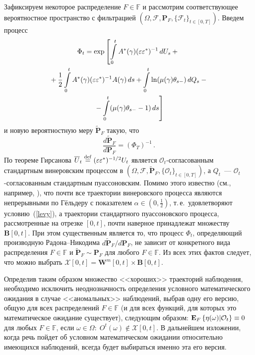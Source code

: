 \begin{multicols}{2}
 Зафиксируем некоторое распределение $F \in \mathbb{F}$ и рассмотрим
 соответствующее вероятностное пространство с фильтрацией
 $(\Omega, \mathcal{F},\mathbf{P}_F,\{\mathcal{F}_t\}_{t\in[0,T]})$.
 Введем процесс
 \begin{multline*}
 \Phi_t=\exp\left[
 \int\limits_0^t A^*(\gamma)(\varepsilon\varepsilon^*)^{-1}\,dU_s+{}\right.\\
{}+ \displaystyle\frac{\displaystyle 1\mathstrut}{\displaystyle 2\mathstrut}\int\limits_0^t
 A^*(\gamma)(\varepsilon\varepsilon^*)^{-1}A(\gamma)\,ds +
 \int\limits_0^t \ln (\mu(\gamma)\theta_{s-})\,dQ_s -{}\\
\left. {}- \int\limits_0^t (\mu(\gamma)\theta_{s-}-1)\,ds
 \right]
\end{multline*}
и новую вероятностную меру $\widetilde{\mathbf{P}}_F$ такую, что
 \[
 \frac{d \widetilde{\mathbf{P}}_F}{d \mathbf{P}_F}=(\Phi_T)^{-1}\,.
 \]
 По теореме Гирсанова \cite{wong,elliott1}
 $\overline{U}_t \stackrel{\mathrm {def}}{=} (\varepsilon\varepsilon^*)^{-1/2}U_t$
 является $\mathcal{O}_t$-согласованным стандартным винеровским
 процессом в $(\Omega,
\mathcal{F},\widetilde{\mathbf{P}}_F,\{\mathcal{O}_t\}_{t\in[0,T]})$,
а $Q_t$~--- $\mathcal{O}_t$-согласованным стандартным пуассоновским.\linebreak
Помимо этого известно (см., например, \cite{l_sh_0}), что почти все
траектории винеровского процесса являются непрерывными по Гёльдеру с
показателем \mbox{$\alpha \in (0,\frac{1}{2})$}, т.\,е.\ удовлетворяют
условию~(\ref{levy}), а траектории стандартного пуассоновского процесса,
рассмотренные на отрезке $[0,t]$, почти наверное принадлежат
множеству $\mathbf{B}[0,t]$. При этом существенным является то, что
процесс $\Phi_t$, определяющий производную Радона--Никодима\linebreak
$ {d \widetilde{\mathbf{P}}_F}/{d \mathbf{P}_F}$,
не зависит от конкретного вида распределения $F \in \mathbb{F}$
 и $\widetilde{\mathbf{P}}_F \sim \mathbf{P}_F$ для любого $F \in \mathbb{F}$.
 Из всех этих фактов следует, что можно выбрать
$\mathcal{X}[0,t] = \displaystyle \mathbf{W}^m[0,t] \times \mathbf{B}[0,t]$.

Определив таким образом множество <<хороших>> траекторий
наблюдения, необходимо исключить неоднозначность определения
условного математического ожидания в случае <<аномальных>>
наблюдений, выбрав одну его версию, общую для всех распределений $F
\in \mathbb{F}$ (и для всех функций, для которых это математическое
ожидание существует), следующим образом:
 $
 \mathbf{E}_{ F }\left\{ \mathop{\eta(\omega)|\mathcal{O}_t} \right\} \equiv 0$ для любых $ F \in
 \mathbb{F}$, если $\omega \in \Omega:\; O^t(\omega) \notin
 \mathcal{X}[0,t].
 $
 В дальнейшем изложении, когда речь пойдет об условном математическом
 ожидании относительно имеющихся наблюдений, всегда будет выбираться
 именно эта его версия.


\end{multicols}
